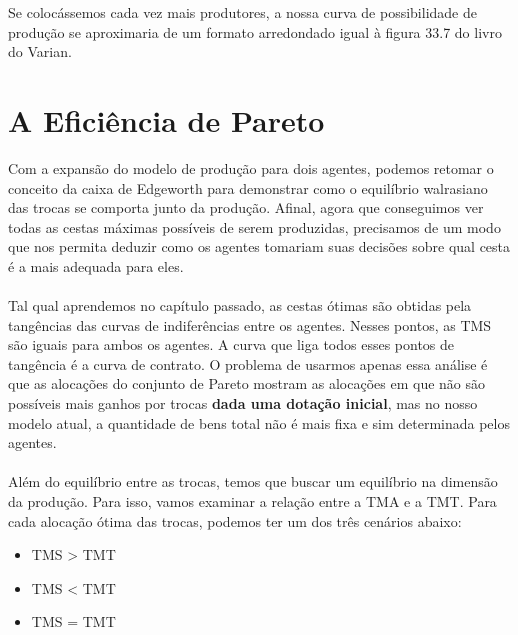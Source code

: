 \documentclass[a4paper,11pt,oneside]{book}
\theoremstyle{definition}
\theoremstyle{break}
\begin{document}
Se colocássemos cada vez mais produtores, a nossa curva de possibilidade de produção se aproximaria de um formato arredondado igual à figura 33.7 do livro do Varian.

\section{A Eficiência de Pareto}

Com a expansão do modelo de produção para dois agentes, podemos retomar o conceito da caixa de Edgeworth para demonstrar como o equilíbrio walrasiano das trocas se comporta junto da produção. Afinal, agora que conseguimos ver todas as cestas máximas possíveis de serem produzidas, precisamos de um modo que nos permita deduzir como os agentes tomariam suas decisões sobre qual cesta é a mais adequada para eles.
\\
\\
Tal qual aprendemos no capítulo passado, as cestas ótimas são obtidas pela tangências das curvas de indiferências entre os agentes. Nesses pontos, as TMS são iguais para ambos os agentes. A curva que liga todos esses pontos de tangência é a curva de contrato. O problema de usarmos apenas essa análise é que as alocações do conjunto de Pareto mostram as alocações em que não são possíveis mais ganhos por trocas \textbf{dada uma dotação inicial}, mas no nosso modelo atual, a quantidade de bens total não é mais fixa e sim determinada pelos agentes.
\\
\\
Além do equilíbrio entre as trocas, temos que buscar um equilíbrio na dimensão da produção. Para isso, vamos examinar a relação entre a TMA e a TMT. Para cada alocação ótima das trocas, podemos ter um dos três cenários abaixo:
\begin{itemize}
	\item TMS > TMT
	\item TMS < TMT
	\item TMS = TMT
\end{itemize}
\end{document}
